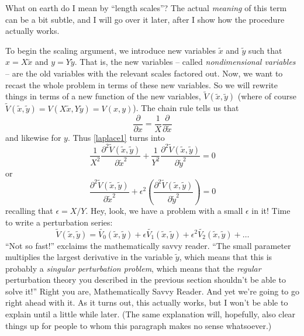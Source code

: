 \documentclass[11pt]{book}
\begin{document}
What on earth do I mean by ``length scales''?  The actual \emph{meaning} of this term can be a bit subtle, and I will go over it later, after I show how the procedure actually works.

To begin the scaling argument, we introduce new variables $\tilde{x}$ and $\tilde{y}$ such that $x = X \tilde{x}$ and $y = Y \tilde{y}$.  That is, the new variables -- called \emph{nondimensional variables} -- are the old variables with the relevant scales factored out.  Now, we want to recast the whole problem in terms of these new variables.  So we will rewrite things in terms of a new function of the new variables, $\tilde{V}(\tilde{x}, \tilde{y})$ (where of course $\tilde{V}(\tilde{x}, \tilde{y}) = V(X\tilde{x}, Y\tilde{y}) = V(x, y)$).  The chain rule tells us that
\begin{equation}\frac{\partial}{\partial x} = \frac{1}{X}\frac{\partial}{\partial \tilde{x}}\end{equation}
and likewise for $y$.  Thus \eqref{laplace1} turns into
\begin{equation} \frac{1}{X^2}\frac{\partial^2 \tilde{V}(\tilde{x},\tilde{y})}{\partial \tilde{x}^2} + \frac{1}{Y^2}\frac{\partial^2 \tilde{V}(\tilde{x},\tilde{y})}{\partial \tilde{y}^2}  = 0\label{laplace2}\end{equation}
or
\begin{equation}\frac{\partial^2 \tilde{V}(\tilde{x},\tilde{y})}{\partial \tilde{x}^2} + \epsilon^2\left(\frac{\partial^2 \tilde{V}(\tilde{x},\tilde{y})}{\partial \tilde{y}^2}\right)  = 0\label{laplace3}\end{equation}
recalling that $\epsilon = X/Y$.  Hey, look, we have a problem with a small $\epsilon$ in it!  Time to write a perturbation series:
\begin{equation}\tilde{V}(\tilde{x}, \tilde{y}) = \tilde{V_0}(\tilde{x}, \tilde{y}) + \epsilon\tilde{V_1}(\tilde{x}, \tilde{y}) + \epsilon^2\tilde{V_2}(\tilde{x}, \tilde{y}) + \ldots\end{equation}
``Not so fast!'' exclaims the mathematically savvy reader.  ``The small parameter multiplies the largest derivative in the variable $\tilde{y}$, which means that this is probably a \emph{singular perturbation problem}, which means that the \emph{regular} perturbation theory you described in the previous section shouldn't be able to solve it!'' Right you are, Mathematically Savvy Reader.  And yet we're going to go right ahead with it.  As it turns out, this actually works, but I won't be able to explain until a little while later.  (The same explanation will, hopefully, also clear things up for people to whom this paragraph makes no sense whatsoever.)
\end{document}
